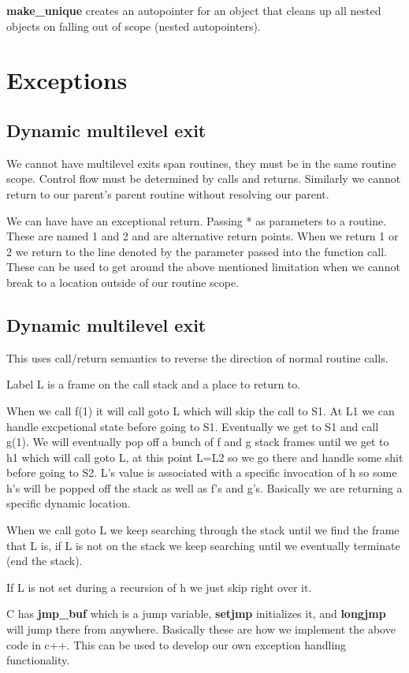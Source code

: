\documentclass{article}
\begin{document}
\textbf{make_unique} creates an autopointer for an object that cleans up all nested objects on falling out of scope (nested autopointers).



\section{Exceptions}
\subsection{Dynamic multilevel exit}
We cannot have multilevel exits span routines, they must be in the same routine scope. Control flow must be determined by calls and returns. Similarly we cannot return to our parent's parent routine without resolving our parent.

We can have have an exceptional return. Passing * as parameters to a routine. These are named 1 and 2 and are alternative return points. When we return 1 or 2 we return to the line denoted by the parameter passed into the function call. These can be used to get around the above mentioned limitation when we cannot break to a location outside of our routine scope.

\subsection{Dynamic multilevel exit}
This uses call/return semantics to reverse the direction of normal routine calls.

Label L is a frame on the call stack and a place to return to.

When we call f(1) it will call goto L which will skip the call to S1. At L1 we can handle excpetional state before going to S1. Eventually we get to S1 and call g(1). We will eventually pop off a bunch of f and g stack frames until we get to h1 which will call goto L, at this point L=L2 so we go there and handle some shit before going to S2. L's value is associated with a specific invocation of h so some h's will be popped off the stack as well as f's and g's. Basically we are returning a specific dynamic location.

When we call goto L we keep searching through the stack until we find the frame that L is, if L is not on the stack we keep searching until we eventually terminate (end the stack).

If L is not set during a recursion of h we just skip right over it.

C has \textbf{jmp_buf} which is a jump variable, \textbf{setjmp} initializes it, and \textbf{longjmp} will jump there from anywhere. Basically these are how we implement the above code in c++. This can be used to develop our own exception handling functionality.
\end{document}
